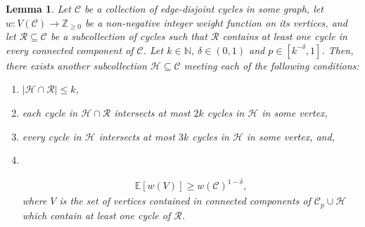 \documentclass[10pt,a4paper]{amsart}
\newtheorem{lemma}{Lemma}
\begin{document}
\begin{lemma}\label{lem: root cycles}
    Let $\mathcal C$ be a collection of edge-disjoint cycles in some graph, let $w:V(\mathcal{C})\rightarrow \mathbb{Z}_{\ge 0}$ be a non-negative integer weight function on its vertices, and let $\mathcal R \subseteq \mathcal C$ be a subcollection of cycles such that $\mathcal R$ contains at least one cycle in every connected component of $\mathcal C$. Let $k\in \mathbb{N}$, $\delta \in (0,1)$ and $p\in [k^{-\delta},1]$. Then, there exists another subcollection $\mathcal H\subseteq \mathcal C$ meeting each of the following conditions:
    \begin{enumerate}[label=(C\arabic*), ref=(C\arabic*)]
    \item \label{cond:C1} $|\mathcal{H}\cap \mathcal{R}|\le k$,
    \item \label{cond:C2} each cycle in $\mathcal H\cap \mathcal R$ intersects at most $2k$ cycles in $\mathcal H$ in some vertex,
    \item \label{cond:C3} every cycle in $\mathcal H$ intersects at most $3k$ cycles in $\mathcal H$ in some vertex, and, 
    \item \label{cond:C4}\textcolor{white}{hack}

    \vspace{-1.4cm}
    \begin{align}\label{exp: cycle expectation}
        \mathbb E[w(V)]\geq w(\mathcal C)^{1-\delta},
    \end{align}
    where $V$ is the set of vertices contained in connected components of $\mathcal C_p\cup \mathcal H$ which contain at least one cycle of $\mathcal R$.
\end{enumerate}
\end{lemma}
\end{document}

